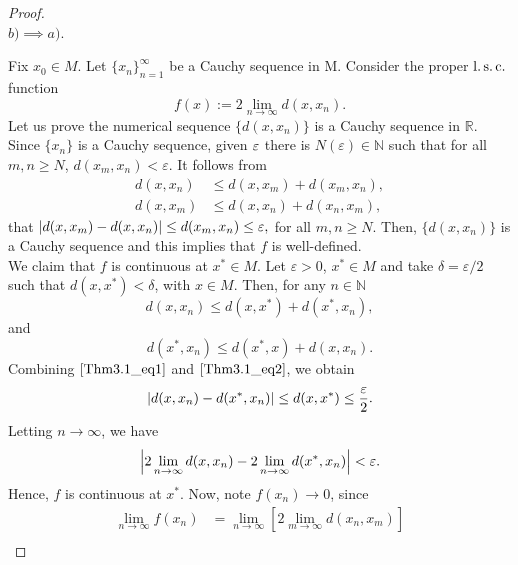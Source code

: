     \begin{proof} \hspace{1cm} \\
        $b) \implies a)$.
        
        Fix $x_0 \in M$. Let $\{x_n\}_{n=1}^{\infty}$ be a Cauchy sequence in M.
        Consider the proper $\operatorname{l.s.c.}$ function
        $$
            f(x) := 2 \lim_{n \to \infty} d(x, x_n).
        $$
        Let us prove the numerical sequence $\{ d(x,x_n)\}$ is a Cauchy sequence
        in $\mathbb{R}$. Since $\{ x_n\}$ is a Cauchy sequence, given $\varepsilon$
        there is $N(\varepsilon) \in \mathbb{N}$ such that for all $m, n \geq N$, 
        $
            d(x_m, x_n) < \varepsilon.
        $
        It follows from 
        \begin{align*}
            d(x, x_n) &\leq d(x,x_m) + d(x_m,x_n), \\
            d(x, x_m) &\leq d(x,x_n) + d(x_n,x_m),
        \end{align*}
        that
        $
            \left\lvert d(x, x_m) - d(x, x_n)\right\rvert \leq d(x_m, x_n) \leq \varepsilon,
        $
        for all $m, n \geq N$. Then, $\{ d(x, x_n)\}$ is a Cauchy sequence and
        this implies that $f$ is well-defined. \\
        We claim that $f$ is continuous at $x^{*} \in M$. Let  $\varepsilon>0$,
        $x^{*} \in M$ and take $\delta = \varepsilon /2$ such that $d(x, x^{*})< \delta$,
        with $x \in M$. Then, for any $n \in \mathbb{N}$
        \begin{equation} \label{Thm3.1_eq1}
            d(x, x_n) \leq d(x, x^{*}) + d(x^{*}, x_n),
        \end{equation}
        and
        \begin{equation} \label{Thm3.1_eq2}
            d(x^{*}, x_n) \leq d(x^{*}, x) + d(x, x_n).
        \end{equation}
        Combining $\cref{Thm3.1_eq1}$ and $\cref{Thm3.1_eq2}$, we obtain
        $$
            \left\lvert d(x,x_n) - d(x^{*}, x_n)\right\rvert \leq d(x, x^{*}) \leq \frac{\varepsilon}{2}.
        $$
        Letting $n \to \infty$, we have 
        $$
            \abs{2\lim_{n \to \infty} d(x, x_n) - 2\lim_{n \to \infty} d(x^{*}, x_n)} %
            < \varepsilon.
        $$
        Hence, $f$ is continuous at $x^{*}$. Now, note $f(x_n) \to 0$, since
        \begin{align*}
            \lim_{n \to \infty} f(x_n) 
            &= 
                \lim_{n \to \infty} \left[2 \lim_{m \to \infty} d(x_n, x_m) \right] \\

\end{align*}
\end{proof}
